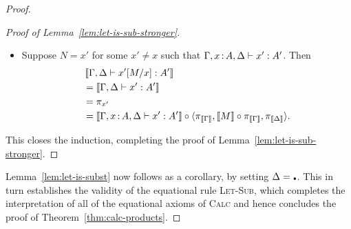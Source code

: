 \begin{proof}
\begin{proof}[Proof of Lemma~\ref{lem:let-is-sub-stronger}]
\begin{itemize}
\begin{align*}
        &= \llbr{\Gamma,\Delta \vdash M : A} \\
        &\stackrel{(*)}= \llbr{\Gamma \vdash M : A} \circ \pi_{\llbr{\Gamma}} \\
        &= \pi_x \circ \angled{\pi_{\llbr{\Gamma}}, \llbr{M} \circ \pi_{\llbr{\Gamma}}, \pi_{\llbr{\Delta}}}
      \end{align*}
      The step marked \((*)\) can be proved as a separate lemma, by induction on typing derivations.
    \item Suppose \(N = x'\) for some \(x' \ne x\) such that \(\Gamma,x\,{:}\, A,\Delta \vdash x' : A'\).
      Then
      \begin{align*}
        &\left\llbracket \Gamma,\Delta \vdash x'[M/x] : A'\right\rrbracket \\
        &= \left\llbracket \Gamma, \Delta  \vdash x' : A'\right\rrbracket\\
        &= \pi_{x'} \\
        &= \left\llbracket \Gamma,x\,{:}\, A,\Delta \vdash x' : A'\right\rrbracket
        \circ \langle \pi_{\left\llbracket \Gamma\right\rrbracket}, \left\llbracket M\right\rrbracket \circ \pi_{\left\llbracket \Gamma\right\rrbracket}, \pi_{\left\llbracket \Delta\right\rrbracket}\rangle.
      \end{align*}
    \end{itemize}
    This closes the induction, completing the proof of Lemma~\ref{lem:let-is-sub-stronger}.
  \end{proof}

  Lemma~\ref{lem:let-is-subst} now follows as a corollary, by setting \(\Delta = \ctxemp\).
  This in turn establishes the validity of the equational rule \textsc{Let-Sub},
  which completes the interpretation of all of the equational axioms of \textsc{Calc}
  and hence concludes the proof of Theorem~\ref{thm:calc-products}.
\end{proof}
